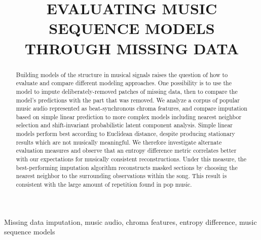 \documentclass{article}
\title{EVALUATING MUSIC SEQUENCE MODELS THROUGH MISSING DATA}
\begin{document}
\ninept
%
\maketitle
%
\begin{abstract}

Building models of the structure in musical signals raises the 
question of how to evaluate and compare different modeling 
approaches.  One possibility is to use the model to impute 
deliberately-removed patches of missing data, then to compare 
the model's predictions with the part that was removed.  
%
  We analyze a corpus of popular music audio represented 
  as beat-synchronous chroma features, and compare imputation
  based on simple linear prediction to more complex
  models including nearest neighbor selection and
  shift-invariant probabilistic latent component analysis.
  Simple linear models perform best according to Euclidean
  distance, despite producing stationary results which are not
  musically meaningful.  We therefore investigate alternate evaluation
  measures %
  and observe that an entropy difference %
  metric correlates 
  better with our %
  expectations for musically consistent reconstructions.
  Under this measure, the best-performing imputation algorithm 
  reconstructs masked sections by choosing the nearest neighbor to the
  surrounding observations within the song.
  This result is consistent with the large amount of repetition  
  found in pop music.
\end{abstract}
%
\begin{keywords}
Missing data imputation, music audio, chroma features, entropy difference,
music sequence models
\end{keywords}
%

\end{document}
